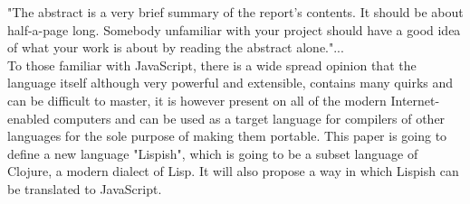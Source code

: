 "The abstract is a very brief summary of the report's contents. It should be about half-a-page long. Somebody unfamiliar with your project should have a good idea of what your work is about by reading the abstract alone."... \\

To those familiar with JavaScript, there is a wide spread opinion that the language itself although very powerful and extensible, contains many quirks and can be difficult to master, it is however present on all of the modern Internet-enabled computers and can be used as a target language for compilers of other languages for the sole purpose of making them portable. 
This paper is going to define a new language "Lispish", which is going to be a subset language of Clojure, a modern dialect of Lisp. It will also propose a way in which Lispish can be translated to JavaScript.